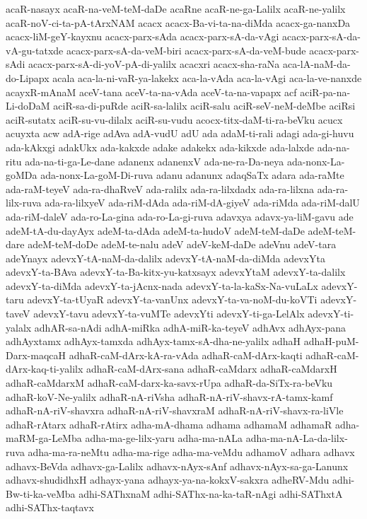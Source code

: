 {acaR-nasayx
acaR-na-veM-teM-daDe
acaRne
acaR-ne-ga-Lalilx
acaR-ne-yalilx
acaR-noV-ci-ta-pA-tArxNAM
acacx
acacx-Ba-vi-ta-na-diMda
acacx-ga-nanxDa
acacx-liM-geY-kayxnu
acacx-parx-sAda
acacx-parx-sA-da-vAgi
acacx-parx-sA-da-vA-gu-tatxde
acacx-parx-sA-da-veM-biri
acacx-parx-sA-da-veM-bude
acacx-parx-sAdi
acacx-parx-sA-di-yoV-pA-di-yalilx
acacxri
acacx-sha-raNa
aca-lA-naM-da-do-Lipapx
acala
aca-la-ni-vaR-ya-lakekx
aca-la-vAda
aca-la-vAgi
aca-la-ve-nanxde
acayxR-mAnaM
aceV-tana
aceV-ta-na-vAda
aceV-ta-na-vapapx
acf
aciR-pa-na-Li-doDaM
aciR-sa-di-puRde
aciR-sa-lalilx
aciR-salu
aciR-seV-neM-deMbe
aciRsi
aciR-sutatx
aciR-su-vu-dilalx
aciR-su-vudu
acocx-titx-daM-ti-ra-beVku
acucx
acuyxta
acw
adA-rige
adAva
adA-vudU
adU
ada
adaM-ti-rali
adagi
ada-gi-huvu
ada-kAkxgi
adakUkx
ada-kakxde
adake
adakekx
ada-kikxde
ada-lalxde
ada-na-ritu
ada-na-ti-ga-Le-dane
adanenx
adanenxV
ada-ne-ra-Da-neya
ada-nonx-La-goMDa
ada-nonx-La-goM-Di-ruva
adanu
adanunx
adaqSaTx
adara
ada-raMte
ada-raM-teyeV
ada-ra-dhaRveV
ada-ralilx
ada-ra-lilxdadx
ada-ra-lilxna
ada-ra-lilx-ruva
ada-ra-lilxyeV
ada-riM-dAda
ada-riM-dA-giyeV
ada-riMda
ada-riM-dalU
ada-riM-daleV
ada-ro-La-gina
ada-ro-La-gi-ruva
adavxya
adavx-ya-liM-gavu
ade
adeM-tA-du-dayAyx
adeM-ta-dAda
adeM-ta-hudoV
adeM-teM-daDe
adeM-teM-dare
adeM-teM-doDe
adeM-te-nalu
adeV
adeV-keM-daDe
adeVnu
adeV-tara
adeYnayx
adevxY-tA-naM-da-dalilx
adevxY-tA-naM-da-diMda
adevxYta
adevxY-ta-BAva
adevxY-ta-Ba-kitx-yu-katxsayx
adevxYtaM
adevxY-ta-dalilx
adevxY-ta-diMda
adevxY-ta-jAcnx-nada
adevxY-ta-la-kaSx-Na-vuLaLx
adevxY-taru
adevxY-ta-tUyaR
adevxY-ta-vanUnx
adevxY-ta-va-noM-du-koVTi
adevxY-taveV
adevxY-tavu
adevxY-ta-vuMTe
adevxYti
adevxY-ti-ga-LelAlx
adevxY-ti-yalalx
adhAR-sa-nAdi
adhA-miRka
adhA-miR-ka-teyeV
adhAvx
adhAyx-pana
adhAyxtamx
adhAyx-tamxda
adhAyx-tamx-sA-dha-ne-yalilx
adhaH
adhaH-puM-Darx-maqcaH
adhaR-caM-dArx-kA-ra-vAda
adhaR-caM-dArx-kaqti
adhaR-caM-dArx-kaq-ti-yalilx
adhaR-caM-dArx-sana
adhaR-caMdarx
adhaR-caMdarxH
adhaR-caMdarxM
adhaR-caM-darx-ka-savx-rUpa
adhaR-da-SiTx-ra-beVku
adhaR-koV-Ne-yalilx
adhaR-nA-riVsha
adhaR-nA-riV-shavx-rA-tamx-kamf
adhaR-nA-riV-shavxra
adhaR-nA-riV-shavxraM
adhaR-nA-riV-shavx-ra-liVle
adhaR-rAtarx
adhaR-rAtirx
adha-mA-dhama
adhama
adhamaM
adhamaR
adha-maRM-ga-LeMba
adha-ma-ge-lilx-yaru
adha-ma-nALa
adha-ma-nA-La-da-lilx-ruva
adha-ma-ra-neMtu
adha-ma-rige
adha-ma-veMdu
adhamoV
adhara
adhavx
adhavx-BeVda
adhavx-ga-Lalilx
adhavx-nAyx-sAnf
adhavx-nAyx-sa-ga-Lanunx
adhavx-shudidhxH
adhayx-yana
adhayx-ya-na-kokxV-sakxra
adheRV-Mdu
adhi-Bw-ti-ka-veMba
adhi-SAThxnaM
adhi-SAThx-na-ka-taR-nAgi
adhi-SAThxtA
adhi-SAThx-taqtavx
}
